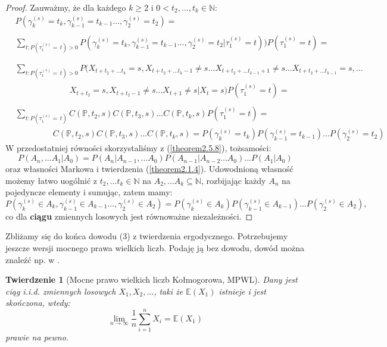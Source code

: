 \documentclass[a4paper]{article}
\theoremstyle{defn}
\theoremstyle{theorem}
\newtheorem{theorem}[defn]{Twierdzenie}
\theoremstyle{lemma}
\theoremstyle{cor}
\theoremstyle{fact}
\begin{document}
\begin{proof}
Zauważmy, że dla każdego $k \geq 2$ i $0 < t_2,...,t_k \in \mathbb{N}$:
\begin{align*}
    &P(\gamma_k^{(s)} = t_k, \gamma_{k-1}^{(s)} = t_{k-1} ..., \gamma_2^{(s)} = t_2) =\\\\
    &\sum\limits_{t: P(\tau_1^{(s)} =\, t) > 0} P(\gamma_k^{(s)} =t_k, \gamma_{k-1}^{(s)} = t_{k-1} ..., \gamma_2^{(s)} = t_2 | \tau_1^{(s)} = t))P(\tau_1^{(s)} = t) =\\\\
    \end{align*}
    \begin{align*}
    &\sum\limits_{t: P(\tau_1^{(s)} =\, t) > 0} P(X_{t+t_2+...t_k} = s, X_{t+t_2+...t_k - 1} \neq s ... X_{t+t_2+...t_{k-1} + 1} \neq s ... X_{t+t_2+...t_{k-1}} = s, ...\\
    &\quad\quad\quad\quad\quad\quad\,\,\, X_{t+t_2} = s, X_{t+t_2 - 1} \neq s ... X_{t+1} \neq s|X_t = s)P(\tau_1^{(s)} = t) = \\\\
    &\sum\limits_{t: P(\tau_1^{(s)} = \, t)} C(\mathbb{P}, t_2, s)C(\mathbb{P}, t_3, s)...C(\mathbb{P}, t_k, s)P(\tau_1^{(s)} = t) =\\
    &\quad\quad\quad\quad\,\,\, C(\mathbb{P}, t_2, s)C(\mathbb{P}, t_3, s)...C(\mathbb{P}, t_k, s) = P(\gamma_k^{(s)} = t_k) P(\gamma_{k-1}^{(s)} = t_{k-1}) ...P(\gamma_2^{(s)} = t_2)
\end{align*}
W przedostatniej równości skorzystaliśmy z (\ref{theorem2.5.8}), tożsamości:
$$P(A_n, ... A_1|A_0) = P(A_n|A_{n-1}, ...A_0)P(A_{n-1}|A_{n-2}...A_0)...P(A_1|A_0)$$
oraz własności Markowa i twierdzenia (\ref{theorem2.1.4}). Udowodnioną własność możemy łatwo uogólnić z $t_2, ... t_k \in \mathbb{N}$ na $A_2, ... A_k \subseteq \mathbb{N}$, rozbijając każdy $A_n$ na pojedyncze elementy i sumując, zatem mamy:
$$P(\gamma_k^{(s)} \in A_k, \gamma_{k-1}^{(s)} \in A_{k-1} ..., \gamma_2^{(s)} \in A_2) = P(\gamma_k^{(s)} \in A_k) P(\gamma_{k-1}^{(s)} \in A_{k-1}) ...P(\gamma_2^{(s)} \in A_{2}),$$
co dla \textbf{ciągu} zmiennych losowych jest równoważne niezależności. 
\end{proof}
Zbliżamy się do końca dowodu (3) z twierdzenia ergodycznego. Potrzebujemy jeszcze wersji mocnego prawa wielkich liczb. Podaję ją bez dowodu, dowód można znaleźć np. w \cite{sztencel}.
\begin{theorem}[Mocne prawo wielkich liczb Kołmogorowa, MPWL]\label{theorem2.5.10}
Dany jest ciąg i.i.d. zmiennych losowych $X_1, X_2, ... $, taki że $\mathbb{E}(X_1)$ istnieje i jest skończona, wtedy:
$$ \lim\limits_{n \to \infty} \frac{1}{n}\sum\limits_{i=1}^n X_i = \mathbb{E}(X_1)$$
prawie na pewno.
\end{theorem}
\end{document}
